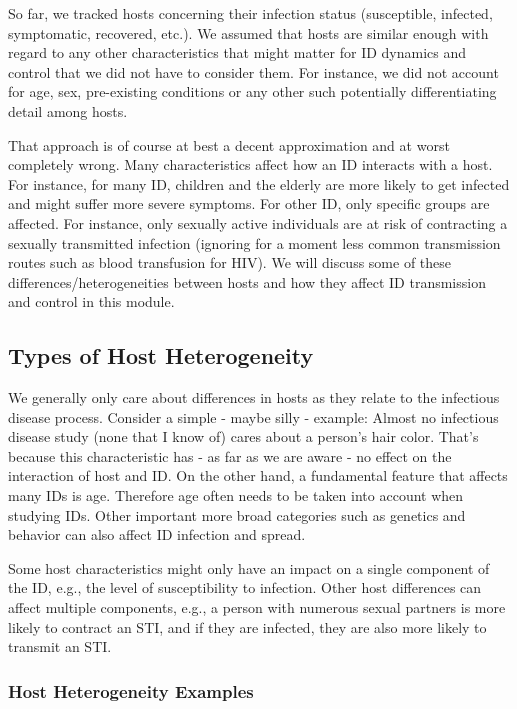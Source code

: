 \documentclass[]{article}
\theoremstyle{definition}
\theoremstyle{definition}
\theoremstyle{definition}
\theoremstyle{remark}
\begin{document}
So far, we tracked hosts concerning their infection status (susceptible,
infected, symptomatic, recovered, etc.). We assumed that hosts are
similar enough with regard to any other characteristics that might
matter for ID dynamics and control that we did not have to consider
them. For instance, we did not account for age, sex, pre-existing
conditions or any other such potentially differentiating detail among
hosts.

That approach is of course at best a decent approximation and at worst
completely wrong. Many characteristics affect how an ID interacts with a
host. For instance, for many ID, children and the elderly are more
likely to get infected and might suffer more severe symptoms. For other
ID, only specific groups are affected. For instance, only sexually
active individuals are at risk of contracting a sexually transmitted
infection (ignoring for a moment less common transmission routes such as
blood transfusion for HIV). We will discuss some of these
differences/heterogeneities between hosts and how they affect ID
transmission and control in this module.

\subsection{Types of Host
Heterogeneity}\label{types-of-host-heterogeneity}

We generally only care about differences in hosts as they relate to the
infectious disease process. Consider a simple - maybe silly - example:
Almost no infectious disease study (none that I know of) cares about a
person's hair color. That's because this characteristic has - as far as
we are aware - no effect on the interaction of host and ID. On the other
hand, a fundamental feature that affects many IDs is age. Therefore age
often needs to be taken into account when studying IDs. Other important
more broad categories such as genetics and behavior can also affect ID
infection and spread.

Some host characteristics might only have an impact on a single
component of the ID, e.g., the level of susceptibility to infection.
Other host differences can affect multiple components, e.g., a person
with numerous sexual partners is more likely to contract an STI, and if
they are infected, they are also more likely to transmit an STI.

\subsubsection{Host Heterogeneity Examples}\label{myexamplebox}
\end{document}
